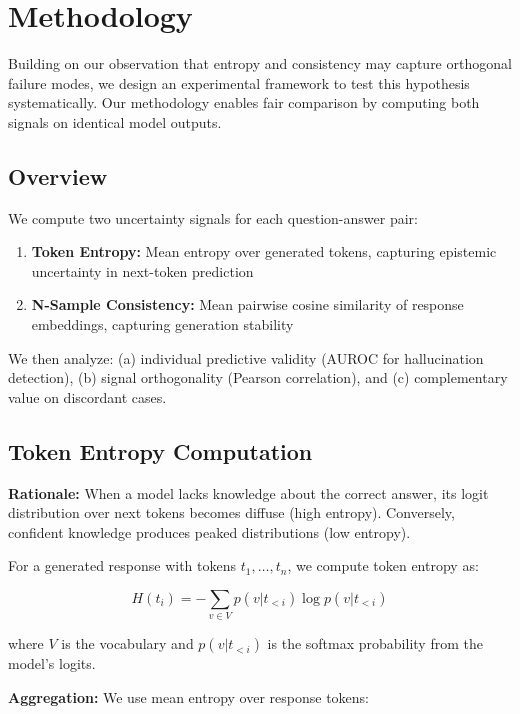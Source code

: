 \section{Methodology}
\label{sec:methodology}

Building on our observation that entropy and consistency may capture orthogonal failure modes, we design an experimental framework to test this hypothesis systematically. Our methodology enables fair comparison by computing both signals on identical model outputs.

\subsection{Overview}

We compute two uncertainty signals for each question-answer pair:

\begin{enumerate}
    \item \textbf{Token Entropy:} Mean entropy over generated tokens, capturing epistemic uncertainty in next-token prediction
    \item \textbf{N-Sample Consistency:} Mean pairwise cosine similarity of response embeddings, capturing generation stability
\end{enumerate}

We then analyze: (a) individual predictive validity (AUROC for hallucination detection), (b) signal orthogonality (Pearson correlation), and (c) complementary value on discordant cases.

\subsection{Token Entropy Computation}

\textbf{Rationale:} When a model lacks knowledge about the correct answer, its logit distribution over next tokens becomes diffuse (high entropy). Conversely, confident knowledge produces peaked distributions (low entropy).

For a generated response with tokens $t_1, \ldots, t_n$, we compute token entropy as:

\begin{equation}
H(t_i) = -\sum_{v \in V} p(v | t_{<i}) \log p(v | t_{<i})
\end{equation}

where $V$ is the vocabulary and $p(v | t_{<i})$ is the softmax probability from the model's logits.

\textbf{Aggregation:} We use mean entropy over response tokens:

